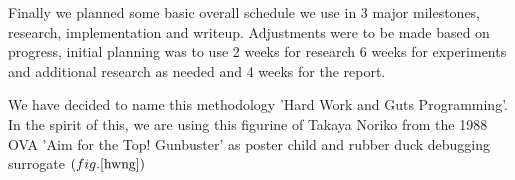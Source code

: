 Finally we planned some basic overall schedule we use in 3 major milestones, research, implementation and writeup. Adjustments were to be made based on progress, initial planning was to use 2 weeks for research 6 weeks for experiments and additional research as needed and 4 weeks for the report.

We have decided to name this methodology 'Hard Work and Guts Programming'. In the spirit of this, we are using this figurine of Takaya Noriko from the 1988 OVA 'Aim for the Top! Gunbuster' as poster child and rubber duck debugging surrogate $\left( fig. \ref{hwng} \right)$